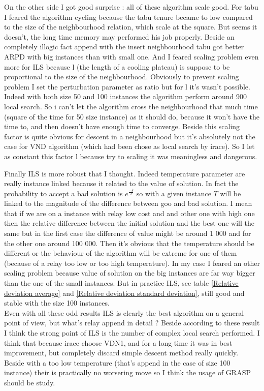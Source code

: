 \documentclass[12pt,a4paper]{article}
\begin{document}
On the other side I got good surprise : all of these algorithm scale good. For tabu I feared the algorithm cycling because the tabu tenure became to low compared to the size of the neighbourhood relation, which scale at the square. But seems it doesn't, the long time memory may performed his job properly. Beside an completely illogic fact append with the insert neighbourhood tabu got better ARPD with big instances than with small one. And I feared scaling problem even more for ILS because l (the length of a cooling plateau) is suppose to be proportional to the size of the neighbourhood. Obviously to prevent scaling problem I set the perturbation parameter as ratio but for l it's wasn't possible. Indeed with both size 50 and 100 instances the algorithm perform around 900 local search. So i can't let the algorithm cross the neighbourhood that much time (square of the time for 50 size instance) as it should do, because it won't have the time to, and then doesn't have enough time to converge. Beside this scaling factor is quite obvious for descent in a neighbourhood but it's absolutely not the case for VND algorithm (which had been chose as local search by irace). So I let as constant this factor l because try to scaling it was meaningless and dangerous.

Finally ILS is more robust that I thought. Indeed temperature parameter are really instance linked because it related to the value of solution. In fact the probability to accept a bad solution is $e^{ \frac{- \delta}{T} }$ so with a given instance $T$ will be linked to the magnitude of the difference between goo and bad solution. I mean that if we are on a instance with relay low cost and and other one with high one then the relative difference between the initial solution and the best one will the same but in the first case the difference of value might be around 1 000 and for the other one around 100 000. Then it's obvious that the temperature should be different or the behaviour of the algorithm will be extreme for one of them (because of a relay too low or too high temperature). In my case I feared an other scaling problem because value of solution on the big instances are far way bigger than the one of the small instances. But in practice ILS, see table \ref{Relative deviation average} and \ref{Relative deviation standard deviation}, still good and stable with the size 100 instances.\\

Even with all these odd results ILS is clearly the best algorithm on a general point of view, but what's relay append in detail ? Beside according to these result I think the strong point of ILS is the number of complex local search performed. I think that because irace choose VDN1, and for a long time it was in best improvement, but completely discard simple descent method really quickly. Beside with a too low temperature (that's append in the case of size 100 instance) their is practically no worsering move so I think the usage of GRASP should be study.
\end{document}
